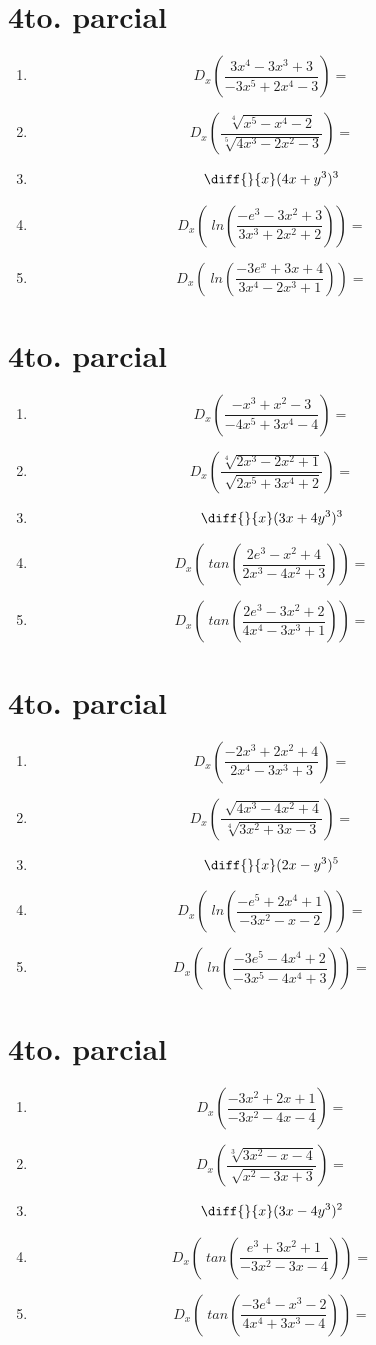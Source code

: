 \documentclass[oneside,spanish,letter]{article}
\begin{document}
\section{4to. parcial}
\begin{enumerate}
 \item $$ D_x \left( \frac{3x^4-3x^3+3}{-3x^5+2x^4-3}\right)=$$
 \item $$ D_x \left( \frac{\sqrt[4]{x^5-x^4-2}}{\sqrt[5]{4x^3-2x^2-3}}\right)=$$
\item $$\diff{}{x}(4x+y^3)^3$$
 \item $$ D_x \left(\;ln\left( \frac{-e^3-3x^2+3}{3x^3+2x^2+2}\right)\right)=$$
 \item $$ D_x \left(\;ln\left( \frac{-3e^x+3x+4}{3x^4-2x^3+1}\right)\right)=$$
 \end{enumerate}
  \newpage
\section{4to. parcial}
\begin{enumerate}
 \item $$ D_x \left( \frac{-x^3+x^2-3}{-4x^5+3x^4-4}\right)=$$
 \item $$ D_x \left( \frac{\sqrt[4]{2x^3-2x^2+1}}{\sqrt[]{2x^5+3x^4+2}}\right)=$$
\item $$\diff{}{x}(3x+4y^3)^3$$
 \item $$ D_x \left(\;tan\left( \frac{2e^3-x^2+4}{2x^3-4x^2+3}\right)\right)=$$
 \item $$ D_x \left(\;tan\left( \frac{2e^3-3x^2+2}{4x^4-3x^3+1}\right)\right)=$$
 \end{enumerate}
  \newpage
\section{4to. parcial}
\begin{enumerate}
 \item $$ D_x \left( \frac{-2x^3+2x^2+4}{2x^4-3x^3+3}\right)=$$
 \item $$ D_x \left( \frac{\sqrt[]{4x^3-4x^2+4}}{\sqrt[4]{3x^2+3x-3}}\right)=$$
\item $$\diff{}{x}(2x-y^3)^5$$
 \item $$ D_x \left(\;ln\left( \frac{-e^5+2x^4+1}{-3x^2-x-2}\right)\right)=$$
 \item $$ D_x \left(\;ln\left( \frac{-3e^5-4x^4+2}{-3x^5-4x^4+3}\right)\right)=$$
 \end{enumerate}
  \newpage
\section{4to. parcial}
\begin{enumerate}
 \item $$ D_x \left( \frac{-3x^2+2x+1}{-3x^2-4x-4}\right)=$$
 \item $$ D_x \left( \frac{\sqrt[3]{3x^2-x-4}}{\sqrt[]{x^2-3x+3}}\right)=$$
\item $$\diff{}{x}(3x-4y^3)^2$$
 \item $$ D_x \left(\;tan\left( \frac{e^3+3x^2+1}{-3x^2-3x-4}\right)\right)=$$
 \item $$ D_x \left(\;tan\left( \frac{-3e^4-x^3-2}{4x^4+3x^3-4}\right)\right)=$$
 \end{enumerate}
  \newpage
\end{document}
